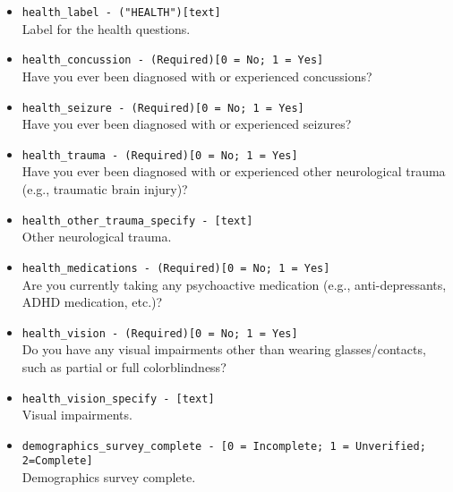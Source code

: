 \begin{description}
\begin{addmargin}[0em]{0em}
\begin{addmargin}[1em]{0em}
\begin{itemize}
            \item \verb|health_label - ("HEALTH")[text]|\\Label for the health questions.
            \item \verb|health_concussion - (Required)[0 = No; 1 = Yes]|\\Have you ever been diagnosed with or experienced concussions?
            \item \verb|health_seizure - (Required)[0 = No; 1 = Yes]|\\Have you ever been diagnosed with or experienced seizures?
            \item \verb|health_trauma - (Required)[0 = No; 1 = Yes]|\\Have you ever been diagnosed with or experienced other neurological trauma (e.g., traumatic brain injury)?
            \item \verb|health_other_trauma_specify - [text]|\\Other neurological trauma.
            \item \verb|health_medications - (Required)[0 = No; 1 = Yes]|\\Are you currently taking any psychoactive medication (e.g., anti-depressants, ADHD medication, etc.)?
            \item \verb|health_vision - (Required)[0 = No; 1 = Yes]|\\Do you have any visual impairments other than wearing glasses/contacts, such as partial or full colorblindness?
            \item \verb|health_vision_specify - [text]|\\Visual impairments.
            \item \verb|demographics_survey_complete - [0 = Incomplete; 1 = Unverified; 2=Complete]|\\Demographics survey complete.\\


\end{itemize}
\end{addmargin}
\end{addmargin}
\end{description}
